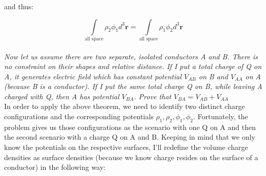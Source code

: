 \documentclass[a4paper, 11pt]{article}
\begin{document}
and thus: 

\begin{equation}
	\int\limits_{\mbox{all space}} \rho_2 \phi_1 d^3\mathbf{r} = \int\limits_{\mbox{all space}} \rho_1 \phi_2 d^3\mathbf{r} 
\end{equation}\\

\textit{Now let us assume there are two separate, isolated conductors A and B. There is no constraint on their shapes and relative distance. If I put a total charge of Q on A, it generates electric field which has constant potential $V_{AB}$ on B and $V_{AA}$ on A (because B is a conductor). If I put the same total charge Q on B, while leaving A charged with Q, then A has potential $V_{BA}$. Prove that $V_{BA} = V_{AB} + V_{AA}$}\\

In order to apply the above theorem, we need to identify two distinct charge configurations and the corresponding potentials $\rho_1, \rho_2, \phi_1, \phi_2$. Fortunately, the problem gives us those configurations as the scenario with one Q on A and then the second scenario with a charge Q on A and B. Keeping in mind that we only know the potentials on the respective surfaces, I'll redefine the volume charge densities as surface densities (because we know charge resides on the surface of a conductor) in the following way: 
\end{document}
